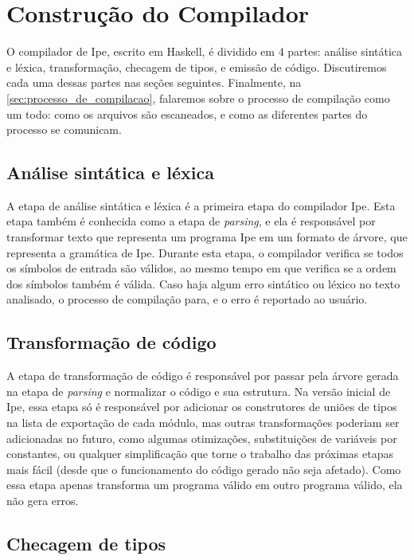 

\chapter{Construção do Compilador}\label{chapter:construcao-do-compilador}

O compilador de Ipe, escrito em Haskell, é dividido em 4 partes: análise sintática e léxica,
transformação, checagem de tipos, e emissão de código. Discutiremos cada uma dessas partes nas seções
seguintes.  Finalmente, na \autoref{sec:processo_de_compilacao}, falaremos sobre o processo de
compilação como um todo: como os arquivos são escaneados, e como as diferentes partes do processo se
comunicam.

\section{Análise sintática e léxica}

A etapa de análise sintática e léxica é a primeira etapa do compilador Ipe. Esta etapa também é
conhecida como a etapa de \textit{parsing}, e ela é responsável por transformar texto que representa
um programa Ipe em um formato de árvore, que representa a gramática de Ipe. Durante esta etapa, o
compilador verifica se todos os símbolos de entrada são válidos, ao mesmo tempo em que verifica se a
ordem dos símbolos também é válida. Caso haja algum erro sintático ou léxico no texto analisado,
o processo de compilação para, e o erro é reportado ao usuário.


\section{Transformação de código}

A etapa de transformação de código é responsável por passar pela árvore gerada na etapa de
\textit{parsing} e normalizar o código e sua estrutura. Na versão inicial de Ipe, essa etapa só é
responsável por adicionar os construtores de uniões de tipos na lista de exportação de cada módulo,
mas outras transformações poderiam ser adicionadas no futuro, como algumas otimizações, substituições
de variáveis por constantes, ou qualquer simplificação que torne o trabalho das próximas etapas mais
fácil (desde que o funcionamento do código gerado não seja afetado). Como essa etapa apenas transforma
um programa válido em outro programa válido, ela não gera erros.

\section{Checagem de tipos}

